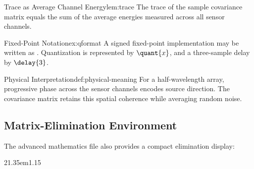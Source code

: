 \begin{lemma}{Trace as Average Channel Energy}{lem:trace}
The trace of the sample covariance matrix equals the sum of the average energies measured
across all sensor channels.
\end{lemma}

\begin{example}{Fixed-Point Notation}{ex:qformat}
A signed fixed-point implementation may be written as . Quantization is
represented by $\quant{x}$, and a three-sample delay by $\delay{3}$.
\end{example}

\begin{definition}{Physical Interpretation}{def:physical-meaning}
For a half-wavelength array, progressive phase across the sensor channels encodes source
direction. The covariance matrix retains this spatial coherence while averaging random noise.
\end{definition}

\subsection{Matrix-Elimination Environment}

The advanced mathematics file also provides a compact elimination display:
\begin{elimination}[1]{2}{1.35em}{1.15}
\end{elimination}

